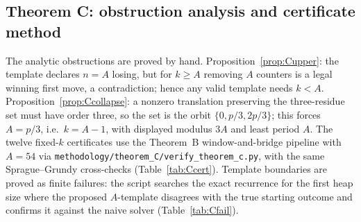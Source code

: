 \subsection{Theorem C: obstruction analysis and certificate method}\label{sec:methodC}
The analytic obstructions are proved by hand. Proposition~\ref{prop:Cupper}: the template declares $n=A$ losing, but for $k\ge A$ removing $A$ counters is a legal winning first move, a contradiction; hence any valid template needs $k<A$. Proposition~\ref{prop:Ccollapse}: a nonzero translation preserving the three-residue set must have order three, so the set is the orbit $\{0,p/3,2p/3\}$; this forces $A=p/3$, i.e.\ $k=A-1$, with displayed modulus $3A$ and least period $A$.
The twelve fixed-$k$ certificates use the Theorem~B window-and-bridge pipeline with $A=54$ via \texttt{methodology/theorem\_C/verify\_theorem\_c.py}, with the same Sprague--Grundy cross-checks (Table~\ref{tab:Ccert}). Template boundaries are proved as finite failures: the script searches the exact recurrence for the first heap size where the proposed $A$-template disagrees with the true starting outcome and confirms it against the naive solver (Table~\ref{tab:Cfail}).
